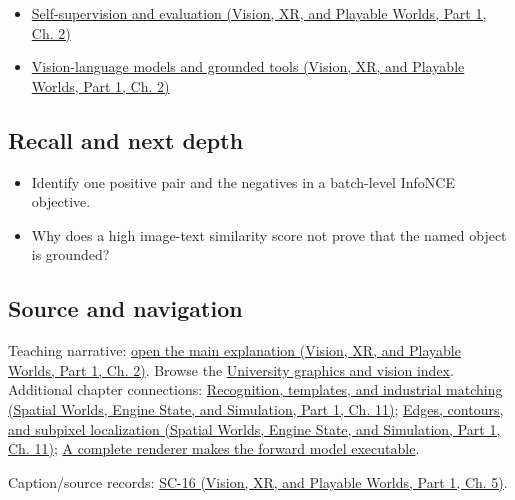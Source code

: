 \hypertarget{appendix-772f1fd96148-full-teaching-explanation}{}

\begin{itemize}
\tightlist
\item
  \href{../07-Vision-XR-and-Playable-Worlds-P01/main.pdf\#04-visual-computing-ii-ch031-self-supervision-and-evaluation}{Self-supervision and evaluation (Vision, XR, and Playable Worlds, Part 1, Ch. 2)}
\item
  \href{../07-Vision-XR-and-Playable-Worlds-P01/main.pdf\#04-visual-computing-ii-ch031-vision-language-models-and-grounded-tools}{Vision-language models and grounded tools (Vision, XR, and Playable Worlds, Part 1, Ch. 2)}
\end{itemize}

\subsection{Recall and next depth}\label{appendix-772f1fd96148-recall-and-next-depth}

\hypertarget{appendix-772f1fd96148-recall-and-next-depth}{}

\begin{itemize}
\tightlist
\item
  Identify one positive pair and the negatives in a batch-level InfoNCE objective.
\item
  Why does a high image-text similarity score not prove that the named object is grounded?
\end{itemize}

\subsection{Source and navigation}\label{appendix-772f1fd96148-source-and-navigation}

\hypertarget{appendix-772f1fd96148-source-and-navigation}{}

Teaching narrative: \href{../07-Vision-XR-and-Playable-Worlds-P01/main.pdf\#04-visual-computing-ii-ch031-self-supervision-and-evaluation}{open the main explanation (Vision, XR, and Playable Worlds, Part 1, Ch. 2)}. Browse the \hyperref[appendix-a6d556a4ef50-university-graphics-vision-and-photography---independent-series]{University graphics and vision index}. Additional chapter connections: \href{../05-Spatial-Worlds-Engine-State-and-Simulation-P01/main.pdf\#04-visual-computing-ii-ch030-recognition-templates-and-industrial-matching}{Recognition, templates, and industrial matching (Spatial Worlds, Engine State, and Simulation, Part 1, Ch. 11)}; \href{../05-Spatial-Worlds-Engine-State-and-Simulation-P01/main.pdf\#04-visual-computing-ii-ch030-edges-contours-and-subpixel-localization}{Edges, contours, and subpixel localization (Spatial Worlds, Engine State, and Simulation, Part 1, Ch. 11)}; \hyperref[04-visual-computing-ii-ch035-a-complete-renderer-makes-the-forward-model-executable]{A complete renderer makes the forward model executable}.

Caption/source records: \href{../07-Vision-XR-and-Playable-Worlds-P01/main.pdf\#04-visual-computing-ii-ch036-sc-16---stanford-cs231n-deep-learning-for-computer-vision-spring-2025-lecture-16-vision-and-language}{SC-16 (Vision, XR, and Playable Worlds, Part 1, Ch. 5)}.
